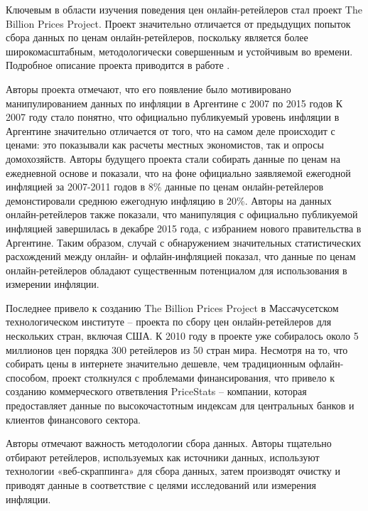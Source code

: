Ключевым в области изучения поведения цен онлайн-ретейлеров стал проект The Billion Prices Project. Проект значительно отличается от предыдущих попыток сбора данных по ценам онлайн-ретейлеров, поскольку является более широкомасштабным, методологически совершенным и устойчивым во времени. Подробное описание проекта приводится в работе \cite{cavallo2016billion}.

Авторы проекта отмечают, что его появление было мотивировано манипулированием данных по инфляции в Аргентине с 2007 по 2015 годов К 2007 году стало понятно, что официально публикуемый уровень инфляции в Аргентине значительно отличается от того, что на самом деле происходит с ценами: это показывали как расчеты местных экономистов, так и опросы домохозяйств. Авторы будущего проекта стали собирать данные по ценам на ежедневной основе и показали, что на фоне официально заявляемой ежегодной инфляцией за 2007-2011 годов в 8\% данные по ценам онлайн-ретейлеров демонстировали среднюю ежегодную инфляцию в 20\%. Авторы на данных онлайн-ретейлеров также показали, что манипуляция с официально публикуемой инфляцией завершилась в декабре 2015 года, с избранием нового правительства в Аргентине. Таким образом, случай с обнаружением значительных статистических расхождений между онлайн- и офлайн-инфляцией показал, что данные по ценам онлайн-ретейлеров обладают существенным потенциалом для использования в измерении инфляции.

Последнее привело к созданию The Billion Prices Project в Массачусетском технологическом институте – проекта по сбору цен онлайн-ретейлеров для нескольких стран, включая США. К 2010 году в проекте уже собиралось около 5 миллионов цен порядка 300 ретейлеров из 50 стран мира. Несмотря на то, что собирать цены в интернете значительно дешевле, чем традиционным офлайн-способом, проект столкнулся с проблемами финансирования, что привело к созданию коммерческого ответвления PriceStats – компании, которая предоставляет данные по высокочастотным индексам для центральных банков и клиентов финансового сектора.

Авторы отмечают важность методологии сбора данных. Авторы тщательно отбирают ретейлеров, используемых как источники данных, используют технологии «веб-скраппинга» для сбора данных, затем производят очистку и приводят данные в соответствие с целями исследований или измерения инфляции. 

